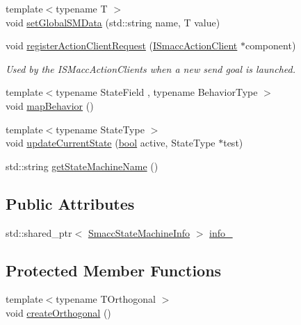 \begin{DoxyCompactItemize}
\item 
{\footnotesize template$<$typename T $>$ }\\void \hyperlink{classsmacc_1_1ISmaccStateMachine_a8588f9e580fbb95b53e2bd2ca3ff1f98}{set\+Global\+S\+M\+Data} (std\+::string name, T value)
\item 
void \hyperlink{classsmacc_1_1ISmaccStateMachine_aacef10d3f0c509612114ff7b21a239d1}{register\+Action\+Client\+Request} (\hyperlink{classsmacc_1_1ISmaccActionClient}{I\+Smacc\+Action\+Client} $\ast$component)
\begin{DoxyCompactList}\small\item\em Used by the I\+S\+Macc\+Action\+Clients when a new send goal is launched. \end{DoxyCompactList}\item 
{\footnotesize template$<$typename State\+Field , typename Behavior\+Type $>$ }\\void \hyperlink{classsmacc_1_1ISmaccStateMachine_acfb75233b79062cc7769ea751b7f320d}{map\+Behavior} ()
\item 
{\footnotesize template$<$typename State\+Type $>$ }\\void \hyperlink{classsmacc_1_1ISmaccStateMachine_aea0936b00b0186e8d4e514af16f69766}{update\+Current\+State} (\hyperlink{classbool}{bool} active, State\+Type $\ast$test)
\item 
std\+::string \hyperlink{classsmacc_1_1ISmaccStateMachine_a2d0b1742f17dd77d5df217153e8b5259}{get\+State\+Machine\+Name} ()
\end{DoxyCompactItemize}
\subsection*{Public Attributes}
\begin{DoxyCompactItemize}
\item 
std\+::shared\+\_\+ptr$<$ \hyperlink{classsmacc_1_1SmaccStateMachineInfo}{Smacc\+State\+Machine\+Info} $>$ \hyperlink{classsmacc_1_1ISmaccStateMachine_a5ec3201cbddab4f062f572fb33021041}{info\+\_\+}
\end{DoxyCompactItemize}
\subsection*{Protected Member Functions}
\begin{DoxyCompactItemize}
\item 
{\footnotesize template$<$typename T\+Orthogonal $>$ }\\void \hyperlink{classsmacc_1_1ISmaccStateMachine_a9155cf3d1877255d70b0bd71648734a3}{create\+Orthogonal} ()
\end{DoxyCompactItemize}
